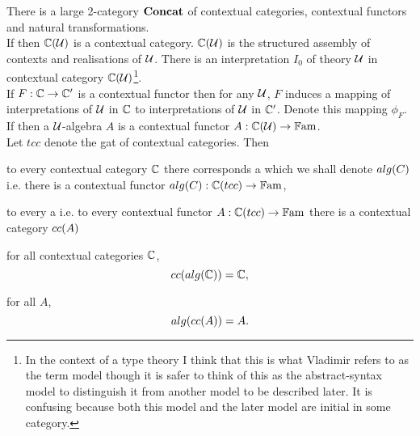 \begin{oldtt}

\note There is a large 2-category $\catofccs$ of contextual categories, contextual functors and natural transformations. \\

\note
If \isagat[U] then $\CofU$ is a contextual category. 
$\CofU$ is the structured assembly of contexts and realisations of $\gat[U]$.
There is an interpretation $I_0$ of theory $\gat[U]$ in contextual category
$\CofU$\footnote{
In the context of a type theory I think that this is what Vladimir refers to as the term model though it is safer to think of this as the abstract-syntax model to distinguish it from another model to be described later. It is confusing because both this model and the later model are initial in some category.}.\\

\note If $F : \ccat[C] \morph \ccat[C']$ is a contextual functor then for any $\gat[U]$, 
$F$ induces a mapping of interpretations of $\gat[U]$ in $\ccat[C]$ to interpretations of $\gat[U]$ in $\ccat[C']$. Denote this mapping $\phi_F$. \\

\note
If \isagat[U] then a $\gat[U]$-algebra $A$ is a contextual functor $A: \CofU \morph \Fam$. \\

\note 
Let $tcc$ denote the gat of contextual categories. Then
\begin{point}
to every contextual category $\ccat[C]$ there corresponds a \tccalgebra 
which we shall denote $\alg{C}$  i.e. there is a contextual functor $\alg{C} :\ccat[C](tcc) \morph \Fam$,
\end{point}
\begin{point}
to every a \tccalgebra i.e. to every contextual functor $A :\ccat[C](tcc) \morph \Fam$ there is a contextual category $\cc{A}$
\end{point}
\begin{point}
for all contextual categories $\ccat[C]$,
\begin{equation}
\cc{\alg{\ccat[C]}}= \ccat[C],
\end{equation}
\end{point}
\begin{point}
for all \tccalgebras $A$,
\begin{equation}
\alg{\cc{A}} = A.
\end{equation}
\end{point}


\end{oldtt}
